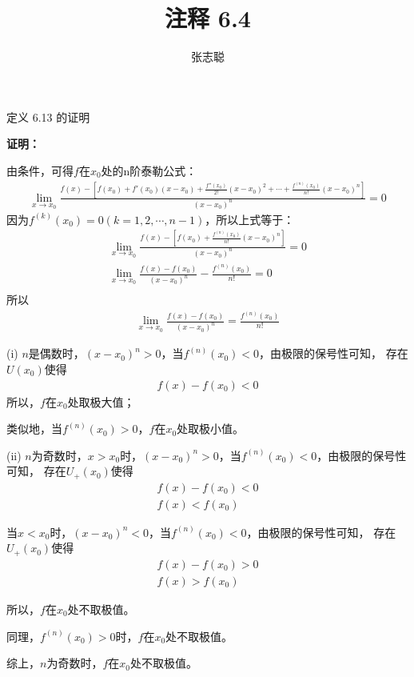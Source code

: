 \documentclass{article}
\begin{document}
\title{注释 6.4}
\author{张志聪}
\maketitle

\begin{zremark}
  定义 6.13 的证明
\end{zremark}

\textbf{证明：}

由条件，可得$f$在$x_0$处的n阶泰勒公式：
\begin{align*}
  \lim\limits_{x \to x_0} \frac{f(x) - [f(x_0) + f'(x_0)(x - x_0) + \frac{f''(x_0)}{2!}(x - x_0)^2 + \cdots + \frac{f^{(n)}(x_0)}{n!}(x - x_0)^n]}{(x - x_0)^n} = 0
\end{align*}
因为$f^{(k)}(x_0) = 0 (k = 1, 2, \cdots, n-1)$，所以上式等于：
\begin{align*}
  \lim\limits_{x \to x_0} \frac{f(x) - [f(x_0) + \frac{f^{(n)}(x_0)}{n!}(x - x_0)^n]}{(x - x_0)^n} = 0 \\
  \lim\limits_{x \to x_0} \frac{f(x) - f(x_0)}{(x - x_0)^n} - \frac{f^{(n)}(x_0)}{n!} = 0 \\
\end{align*}
所以 
\begin{align*}
  \lim\limits_{x \to x_0} \frac{f(x) - f(x_0)}{(x - x_0)^n} = \frac{f^{(n)}(x_0)}{n!}
\end{align*}

(i) $n$是偶数时，$(x - x_0)^n > 0$，当$f^{(n)}(x_0) < 0$，由极限的保号性可知，
存在$U(x_0)$使得
\begin{align*}
  f(x) - f(x_0) < 0
\end{align*}
所以，$f$在$x_0$处取极大值；

类似地，当$f^{(n)}(x_0) > 0$，$f$在$x_0$处取极小值。

(ii) $n$为奇数时，$x > x_0$时，$(x - x_0)^n > 0$，当$f^{(n)}(x_0) < 0$，由极限的保号性可知，
存在$U_+(x_0)$使得
\begin{align*}
  f(x) - f(x_0) < 0 \\
  f(x) < f(x_0)
\end{align*}

当$x < x_0$时，$(x - x_0)^n < 0$，当$f^{(n)}(x_0) < 0$，由极限的保号性可知，
存在$U_+(x_0)$使得
\begin{align*}
  f(x) - f(x_0) > 0 \\
  f(x) > f(x_0)
\end{align*}

所以，$f$在$x_0$处不取极值。

同理，$f^{(n)}(x_0) > 0$时，$f$在$x_0$处不取极值。

综上，$n$为奇数时，$f$在$x_0$处不取极值。
\end{document}
